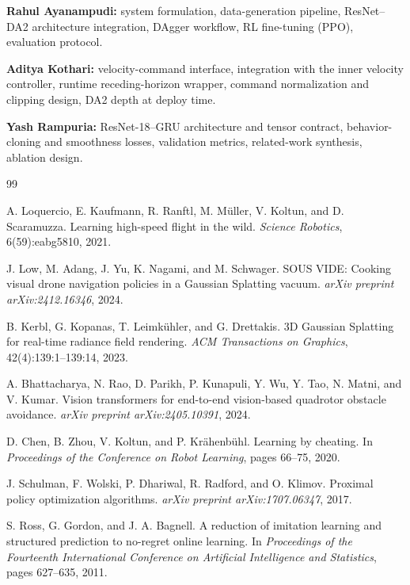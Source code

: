 \documentclass[10pt,twocolumn,letterpaper]{article}
\begin{document}
\textbf{Rahul Ayanampudi:} system formulation, data-generation pipeline, ResNet--DA2 architecture integration, DAgger workflow, RL fine-tuning (PPO), evaluation protocol.

\textbf{Aditya Kothari:} velocity-command interface, integration with the inner velocity controller, runtime receding-horizon wrapper, command normalization and clipping design, DA2 depth at deploy time.

\textbf{Yash Rampuria:} ResNet-18--GRU architecture and tensor contract, behavior-cloning and smoothness losses, validation metrics, related-work synthesis, ablation design.

\balance
{\small
\begin{thebibliography}{99}

A. Loquercio, E. Kaufmann, R. Ranftl, M. M\"uller, V. Koltun, and D. Scaramuzza.
Learning high-speed flight in the wild.
\emph{Science Robotics}, 6(59):eabg5810, 2021.

J. Low, M. Adang, J. Yu, K. Nagami, and M. Schwager.
{SOUS VIDE}: Cooking visual drone navigation policies in a Gaussian Splatting vacuum.
\emph{arXiv preprint arXiv:2412.16346}, 2024.

B. Kerbl, G. Kopanas, T. Leimk\"uhler, and G. Drettakis.
3D Gaussian Splatting for real-time radiance field rendering.
\emph{ACM Transactions on Graphics}, 42(4):139:1--139:14, 2023.

A. Bhattacharya, N. Rao, D. Parikh, P. Kunapuli, Y. Wu, Y. Tao, N. Matni, and V. Kumar.
Vision transformers for end-to-end vision-based quadrotor obstacle avoidance.
\emph{arXiv preprint arXiv:2405.10391}, 2024.

D. Chen, B. Zhou, V. Koltun, and P. Kr\"ahenb\"uhl.
Learning by cheating.
In \emph{Proceedings of the Conference on Robot Learning}, pages 66--75, 2020.

J. Schulman, F. Wolski, P. Dhariwal, R. Radford, and O. Klimov.
Proximal policy optimization algorithms.
\emph{arXiv preprint arXiv:1707.06347}, 2017.

S. Ross, G. Gordon, and J. A. Bagnell.
A reduction of imitation learning and structured prediction to no-regret online learning.
In \emph{Proceedings of the Fourteenth International Conference on Artificial Intelligence and Statistics}, pages 627--635, 2011.


\end{thebibliography}}
\end{document}

